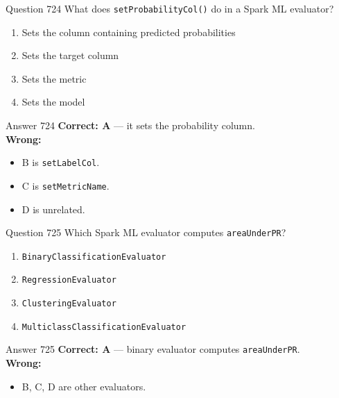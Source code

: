 \documentclass[aspectratio=169,11pt]{beamer}
\begin{document}
	\begin{frame}{Question 724}
		What does \texttt{setProbabilityCol()} do in a Spark ML evaluator?
		\begin{enumerate}[label=\Alph*.]
			\item Sets the column containing predicted probabilities
			\item Sets the target column
			\item Sets the metric
			\item Sets the model
		\end{enumerate}
	\end{frame}
	\begin{frame}{Answer 724}
		\textbf{Correct: A} --- it sets the probability column.\\
		\vspace{0.5em}
		\textbf{Wrong:}
		\begin{itemize}
			\item B is \texttt{setLabelCol}.
			\item C is \texttt{setMetricName}.
			\item D is unrelated.
		\end{itemize}
	\end{frame}
	
	\begin{frame}{Question 725}
		Which Spark ML evaluator computes \texttt{areaUnderPR}?
		\begin{enumerate}[label=\Alph*.]
			\item \texttt{BinaryClassificationEvaluator}
			\item \texttt{RegressionEvaluator}
			\item \texttt{ClusteringEvaluator}
			\item \texttt{MulticlassClassificationEvaluator}
		\end{enumerate}
	\end{frame}
	\begin{frame}{Answer 725}
		\textbf{Correct: A} --- binary evaluator computes \texttt{areaUnderPR}.\\
		\vspace{0.5em}
		\textbf{Wrong:}
		\begin{itemize}
			\item B, C, D are other evaluators.
		\end{itemize}
	\end{frame}
	
\end{document}
